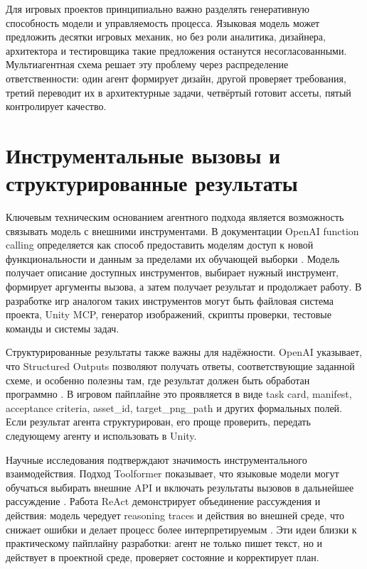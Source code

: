 \documentclass[a4paper,12pt]{report}
\begin{document}
Для игровых проектов принципиально важно разделять генеративную способность модели и управляемость процесса. Языковая модель может предложить десятки игровых механик, но без роли аналитика, дизайнера, архитектора и тестировщика такие предложения останутся несогласованными. Мультиагентная схема решает эту проблему через распределение ответственности: один агент формирует дизайн, другой проверяет требования, третий переводит их в архитектурные задачи, четвёртый готовит ассеты, пятый контролирует качество.

\section{Инструментальные вызовы и структурированные результаты}

Ключевым техническим основанием агентного подхода является возможность связывать модель с внешними инструментами. В документации OpenAI function calling определяется как способ предоставить моделям доступ к новой функциональности и данным за пределами их обучающей выборки \cite{openai-function-calling}. Модель получает описание доступных инструментов, выбирает нужный инструмент, формирует аргументы вызова, а затем получает результат и продолжает работу. В разработке игр аналогом таких инструментов могут быть файловая система проекта, Unity MCP, генератор изображений, скрипты проверки, тестовые команды и системы задач.

Структурированные результаты также важны для надёжности. OpenAI указывает, что Structured Outputs позволяют получать ответы, соответствующие заданной схеме, и особенно полезны там, где результат должен быть обработан программно \cite{openai-structured-outputs}. В игровом пайплайне это проявляется в виде task card, manifest, acceptance criteria, asset\_id, target\_png\_path и других формальных полей. Если результат агента структурирован, его проще проверить, передать следующему агенту и использовать в Unity.

Научные исследования подтверждают значимость инструментального взаимодействия. Подход Toolformer показывает, что языковые модели могут обучаться выбирать внешние API и включать результаты вызовов в дальнейшее рассуждение \cite{toolformer}. Работа ReAct демонстрирует объединение рассуждения и действия: модель чередует reasoning traces и действия во внешней среде, что снижает ошибки и делает процесс более интерпретируемым \cite{react}. Эти идеи близки к практическому пайплайну разработки: агент не только пишет текст, но и действует в проектной среде, проверяет состояние и корректирует план.
\end{document}
